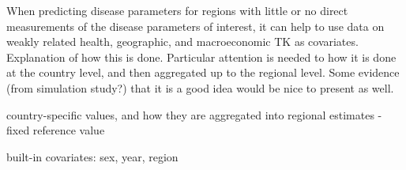 When predicting disease parameters for regions with little or no
direct measurements of the disease parameters of interest, it can help
to use data on weakly related health, geographic, and macroeconomic TK
as covariates. Explanation of how this is done.  Particular attention
is needed to how it is done at the country level, and then aggregated
up to the regional level. Some evidence (from simulation study?) that
it is a good idea would be nice to present as well.

country-specific values, and how they are aggregated into regional
estimates - fixed reference value

built-in covariates: sex, year, region


